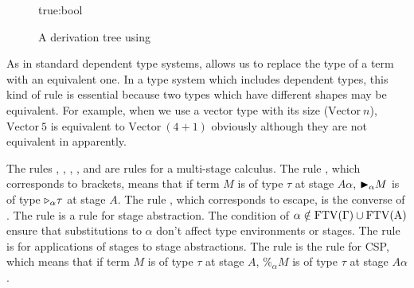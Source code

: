 \begin{figure}
    \begin{center}
        \begin{minipage}{0.50\hsize}
            {\textrm{true}:\textrm{bool} \in \Sigma \andalso
                 \andalso
            }
            \caption{A derivation tree using \TConst}
            \label{fig:tconst-derivation-tree}
        \end{minipage}
    \end{center}
\end{figure}


{}
As in standard dependent type systems, \TConv{} allows us to replace
the type of a term with an equivalent one.
In a type system which includes dependent types, this kind of rule is essential
because two types which have different shapes may be equivalent.
For example, when we use a vector type with its size ($\textrm{Vector}\ n$),
$\textrm{Vector}\ 5$ is equivalent to $\textrm{Vector}\ (4+1)$ obviously although they are not equivalent in apparently.

The rules \TTB, \TTBL, \TGen, \TIns, and \TCsp{} are rules for a multi-stage calculus.
The rule \TTB{}, which corresponds to brackets, means that if term $M$ is of type $\tau$ at stage $A\alpha$,
${\mathop{\blacktriangleright}}_\alpha M$ is of type ${\mathop{\triangleright}}_\alpha \tau$ at stage $A$.
The rule \TTBL{}, which corresponds to escape, is the converse of \TTB.
The rule \TGen{} is a rule for stage abstraction.
The condition of $\alpha\notin\rm{FTV}(\Gamma)\cup\rm{FTV}(A)$ ensure that
substitutions to $\alpha$ don't affect type environments or stages.
The rule \TIns{} is for applications of stages to stage abstractions.
The rule \TCsp is the rule for CSP, which means that
if term $M$ is of type $\tau$ at stage $A$, $\%_\alpha M$ is of type $\tau$ at stage $A\alpha$.


